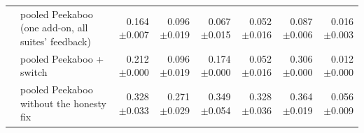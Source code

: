 \begin{table}[tbp]
{\begin{tabular}{llrrrrrr}
 & pooled Peekaboo (one add-on, all suites' feedback) & 0.164 {\scriptsize$\pm$0.007} & 0.096 {\scriptsize$\pm$0.019} & 0.067 {\scriptsize$\pm$0.015} & 0.052 {\scriptsize$\pm$0.016} & 0.087 {\scriptsize$\pm$0.006} & 0.016 {\scriptsize$\pm$0.003} \\
 & pooled Peekaboo + switch & 0.212 {\scriptsize$\pm$0.000} & 0.096 {\scriptsize$\pm$0.019} & 0.174 {\scriptsize$\pm$0.000} & 0.052 {\scriptsize$\pm$0.016} & 0.306 {\scriptsize$\pm$0.000} & 0.012 {\scriptsize$\pm$0.000} \\
 & pooled Peekaboo without the honesty fix & 0.328 {\scriptsize$\pm$0.033} & 0.271 {\scriptsize$\pm$0.029} & 0.349 {\scriptsize$\pm$0.054} & 0.328 {\scriptsize$\pm$0.036} & 0.364 {\scriptsize$\pm$0.019} & 0.056 {\scriptsize$\pm$0.009} \\
\bottomrule
\end{tabular}}
\end{table}

